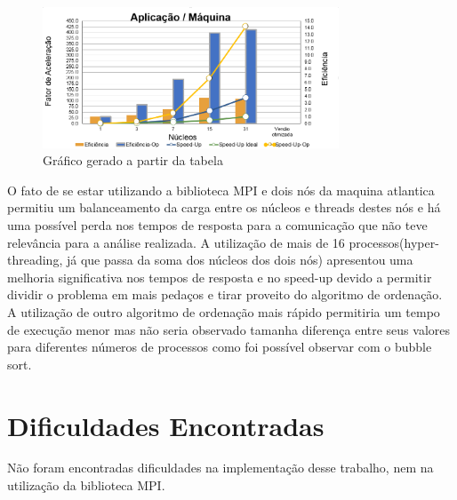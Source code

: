 \documentclass[9pt]{IEEEtran}
\begin{document}
	\begin{figure}[H]
		\centering
		\includegraphics[width=88mm]{doc/graph.PNG}
		\caption{Gráfico gerado a partir da tabela}
		\label{fig_graph}
	\end{figure}

	O fato de se estar utilizando a biblioteca MPI e dois nós da maquina
	atlantica permitiu um balanceamento da carga entre os núcleos e threads
	destes nós e há uma possível perda nos tempos de resposta para a comunicação
	que não teve relevância para a análise realizada. A utilização de mais de 16
	processos(hyper-threading, já que passa da soma dos núcleos dos dois nós)
	apresentou uma melhoria significativa nos tempos de resposta e no speed-up
	devido a permitir dividir o problema em mais pedaços e tirar proveito do
	algoritmo de ordenação. A utilização de outro algoritmo de ordenação mais
	rápido permitiria um tempo de execução menor mas não seria observado tamanha
	diferença entre seus valores para diferentes números de processos como foi
	possível observar com o bubble sort.


\section{Dificuldades Encontradas}

	Não foram encontradas dificuldades na implementação desse trabalho, nem na
	utilização da biblioteca MPI\@.
\end{document}
